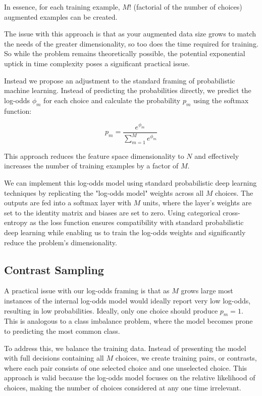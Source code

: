 \documentclass[11pt]{article}
\begin{document}
In essence, for each training example, $M!$ (factorial of the number of choices) augmented examples can be created.

The issue with this approach is that as your augmented data size grows to match the needs of the greater dimensionality, so too does the time required for training. So while the problem remains theoretically possible, the potential exponential uptick in time complexity poses a significant practical issue. 


Instead we propose an adjustment to the standard framing of probabilistic machine learning. Instead of predicting the probabilities directly, we predict the log-odds $\phi_m$ for each choice and calculate the probability $p_m$ using the softmax function:

$$p_m = \frac{e^{\phi_m}}{\sum_{m=1}^{M}e^{\phi_m}}$$

This approach reduces the feature space dimensionality to $N$ and effectively increases the number of training examples by a factor of $M$.

We can implement this log-odds model using standard probabilistic deep learning techniques by replicating the "log-odds model" weights across all $M$ choices. The outputs are fed into a softmax layer with $M$ units, where the layer's weights are set to the identity matrix and biases are set to zero. Using categorical cross-entropy as the loss function ensures compatibility with standard probabilistic deep learning while enabling us to train the log-odds weights and significantly reduce the problem's dimensionality.

\subsection*{Contrast Sampling}

A practical issue with our log-odds framing is that as $M$ grows large most instances of the internal log-odds model would ideally report very low log-odds, resulting in low probabilities. Ideally, only one choice should produce $p_m=1$. This is analogous to a class imbalance problem, where the model becomes prone to predicting the most common class.

To address this, we balance the training data. Instead of presenting the model with full decisions containing all $M$ choices, we create training pairs, or contrasts, where each pair consists of one selected choice and one unselected choice. This approach is valid because the log-odds model focuses on the relative likelihood of choices, making the number of choices considered at any one time irrelevant.
\end{document}
